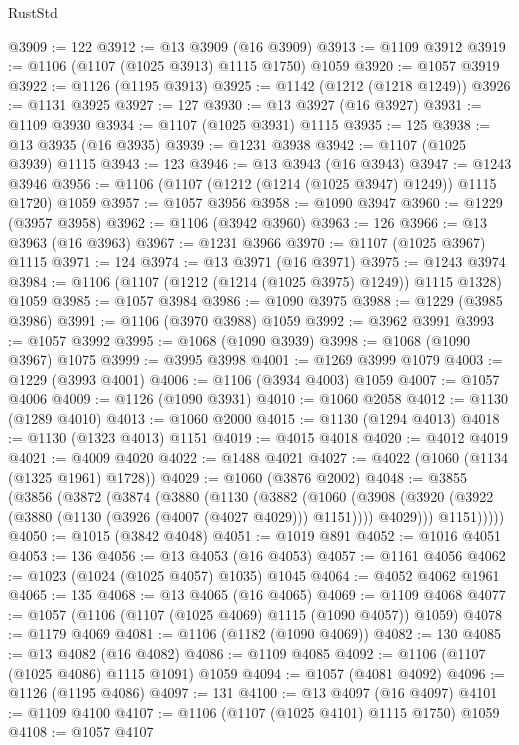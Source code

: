 \begin{lexlean}{RustStd}
\begin{coremodule}
@3909 := 122
@3912 := @13 @3909 (@16 @3909)
@3913 := @1109 @3912
@3919 := @1106 (@1107 (@1025 @3913) @1115 @1750) @1059
@3920 := @1057 @3919
@3922 := @1126 (@1195 @3913)
@3925 := @1142 (@1212 (@1218 @1249))
@3926 := @1131 @3925
@3927 := 127
@3930 := @13 @3927 (@16 @3927)
@3931 := @1109 @3930
@3934 := @1107 (@1025 @3931) @1115
@3935 := 125
@3938 := @13 @3935 (@16 @3935)
@3939 := @1231 @3938
@3942 := @1107 (@1025 @3939) @1115
@3943 := 123
@3946 := @13 @3943 (@16 @3943)
@3947 := @1243 @3946
@3956 := @1106 (@1107 (@1212 (@1214 (@1025 @3947) @1249)) @1115 @1720) @1059
@3957 := @1057 @3956
@3958 := @1090 @3947
@3960 := @1229 (@3957 @3958)
@3962 := @1106 (@3942 @3960)
@3963 := 126
@3966 := @13 @3963 (@16 @3963)
@3967 := @1231 @3966
@3970 := @1107 (@1025 @3967) @1115
@3971 := 124
@3974 := @13 @3971 (@16 @3971)
@3975 := @1243 @3974
@3984 := @1106 (@1107 (@1212 (@1214 (@1025 @3975) @1249)) @1115 @1328) @1059
@3985 := @1057 @3984
@3986 := @1090 @3975
@3988 := @1229 (@3985 @3986)
@3991 := @1106 (@3970 @3988) @1059
@3992 := @3962 @3991
@3993 := @1057 @3992
@3995 := @1068 (@1090 @3939)
@3998 := @1068 (@1090 @3967) @1075
@3999 := @3995 @3998
@4001 := @1269 @3999 @1079
@4003 := @1229 (@3993 @4001)
@4006 := @1106 (@3934 @4003) @1059
@4007 := @1057 @4006
@4009 := @1126 (@1090 @3931)
@4010 := @1060 @2058
@4012 := @1130 (@1289 @4010)
@4013 := @1060 @2000
@4015 := @1130 (@1294 @4013)
@4018 := @1130 (@1323 @4013) @1151
@4019 := @4015 @4018
@4020 := @4012 @4019
@4021 := @4009 @4020
@4022 := @1488 @4021
@4027 := @4022 (@1060 (@1134 (@1325 @1961) @1728))
@4029 := @1060 (@3876 @2002)
@4048 := @3855
    (@3856
      (@3872
        (@3874
          (@3880
            (@1130
              (@3882
                (@1060
                  (@3908
                    (@3920 (@3922 (@3880 (@1130 (@3926 (@4007 (@4027 @4029))) @1151))))
                    @4029)))
              @1151)))))
@4050 := @1015 (@3842 @4048)
@4051 := @1019 @891
@4052 := @1016 @4051
@4053 := 136
@4056 := @13 @4053 (@16 @4053)
@4057 := @1161 @4056
@4062 := @1023 (@1024 (@1025 @4057) @1035) @1045
@4064 := @4052 @4062 @1961
@4065 := 135
@4068 := @13 @4065 (@16 @4065)
@4069 := @1109 @4068
@4077 := @1057 (@1106 (@1107 (@1025 @4069) @1115 (@1090 @4057)) @1059)
@4078 := @1179 @4069
@4081 := @1106 (@1182 (@1090 @4069))
@4082 := 130
@4085 := @13 @4082 (@16 @4082)
@4086 := @1109 @4085
@4092 := @1106 (@1107 (@1025 @4086) @1115 @1091) @1059
@4094 := @1057 (@4081 @4092)
@4096 := @1126 (@1195 @4086)
@4097 := 131
@4100 := @13 @4097 (@16 @4097)
@4101 := @1109 @4100
@4107 := @1106 (@1107 (@1025 @4101) @1115 @1750) @1059
@4108 := @1057 @4107

\end{coremodule}
\end{lexlean}

